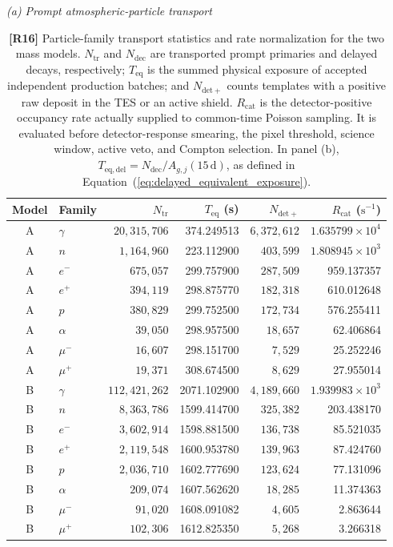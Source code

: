 \documentclass[11pt]{article}
\begin{document}
\begingroup
\color{revisionblue}
\begin{table}[!htbp]
\color{revisionblue}
\centering
{}
\caption{\textbf{[R16]} Particle-family transport statistics and rate
normalization for the two mass models. $N_{\mathrm{tr}}$ and $N_{\mathrm{dec}}$
are transported prompt primaries and delayed decays, respectively;
$T_{\mathrm{eq}}$ is the summed physical exposure of accepted independent
production batches; and $N_{\mathrm{det+}}$ counts templates with a positive
raw deposit in the TES or an active shield. $R_{\mathrm{cat}}$ is the
detector-positive occupancy rate actually supplied to common-time Poisson
sampling. It is evaluated before detector-response smearing, the pixel
threshold, science window, active veto, and Compton selection. In panel (b),
$T_{\mathrm{eq,del}}=N_{\mathrm{dec}}/A_{g,j}(15\,\mathrm d)$, as defined in
Equation~(\ref{eq:delayed_equivalent_exposure}).}
\label{tab:background_source_model}
\scriptsize
\setlength{\tabcolsep}{5.0pt}
\renewcommand{\arraystretch}{0.92}
\noindent\textit{(a) Prompt atmospheric-particle transport}\par\vspace{0.20em}
\begin{tabular}{clrrrr}
\toprule
Model & Family & $N_{\mathrm{tr}}$ & $T_{\mathrm{eq}}$ (s)
& $N_{\mathrm{det+}}$ & $R_{\mathrm{cat}}$ ($\mathrm{s^{-1}}$) \\
\midrule
A & $\gamma$ & $20{,}315{,}706$ & 374.249513 & $6{,}372{,}612$ & $1.635799\times10^{4}$ \\
A & $n$ & $1{,}164{,}960$ & 223.112900 & $403{,}599$ & $1.808945\times10^{3}$ \\
A & $e^-$ & $675{,}057$ & 299.757900 & $287{,}509$ & 959.137357 \\
A & $e^+$ & $394{,}119$ & 298.875770 & $182{,}318$ & 610.012648 \\
A & $p$ & $380{,}829$ & 299.752500 & $172{,}734$ & 576.255411 \\
A & $\alpha$ & $39{,}050$ & 298.957500 & $18{,}657$ & 62.406864 \\
A & $\mu^-$ & $16{,}607$ & 298.151700 & $7{,}529$ & 25.252246 \\
A & $\mu^+$ & $19{,}371$ & 308.674500 & $8{,}629$ & 27.955014 \\
\addlinespace[0.25em]
B & $\gamma$ & $112{,}421{,}262$ & 2071.102900 & $4{,}189{,}660$ & $1.939983\times10^{3}$ \\
B & $n$ & $8{,}363{,}786$ & 1599.414700 & $325{,}382$ & 203.438170 \\
B & $e^-$ & $3{,}602{,}914$ & 1598.881500 & $136{,}738$ & 85.521035 \\
B & $e^+$ & $2{,}119{,}548$ & 1600.953780 & $139{,}963$ & 87.424760 \\
B & $p$ & $2{,}036{,}710$ & 1602.777690 & $123{,}624$ & 77.131096 \\
B & $\alpha$ & $209{,}074$ & 1607.562620 & $18{,}285$ & 11.374363 \\
B & $\mu^-$ & $91{,}020$ & 1608.091082 & $4{,}605$ & 2.863644 \\
B & $\mu^+$ & $102{,}306$ & 1612.825350 & $5{,}268$ & 3.266318 \\
\bottomrule
\end{tabular}


\end{table}
\end{document}
